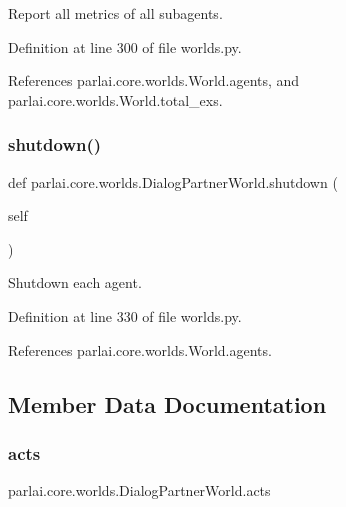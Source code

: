 \begin{DoxyVerb}Report all metrics of all subagents.\end{DoxyVerb}
 

Definition at line 300 of file worlds.\+py.



References parlai.\+core.\+worlds.\+World.\+agents, and parlai.\+core.\+worlds.\+World.\+total\+\_\+exs.

\mbox{\label{classparlai_1_1core_1_1worlds_1_1DialogPartnerWorld_a281de2cc19b4f7c07ddd51d7c213f3ea}} 
\subsubsection{\texorpdfstring{shutdown()}{shutdown()}}
{\footnotesize\ttfamily def parlai.\+core.\+worlds.\+Dialog\+Partner\+World.\+shutdown (\begin{DoxyParamCaption}\item[{}]{self }\end{DoxyParamCaption})}

\begin{DoxyVerb}Shutdown each agent.\end{DoxyVerb}
 

Definition at line 330 of file worlds.\+py.



References parlai.\+core.\+worlds.\+World.\+agents.



\subsection{Member Data Documentation}
\mbox{\label{classparlai_1_1core_1_1worlds_1_1DialogPartnerWorld_ab20044fc960066ca7e04bc4cf580a2be}} 
\subsubsection{\texorpdfstring{acts}{acts}}
{\footnotesize\ttfamily parlai.\+core.\+worlds.\+Dialog\+Partner\+World.\+acts}



